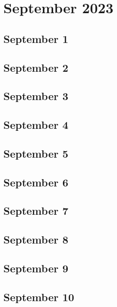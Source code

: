 %
%
%

\chapter{September 2023}
\label{intro} %

\section{September 1}

\section{September 2}

\section{September 3}

\section{September 4}

\section{September 5}

\section{September 6}

\section{September 7}

\section{September 8}

\section{September 9}

\section{September 10}

